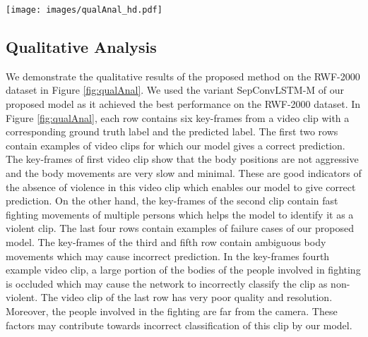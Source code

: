 \documentclass[conference]{IEEEtran}
\begin{document}
\begin{figure*}[t] 
\centering
\texttt{[image: images/qualAnal\_hd.pdf]}   \caption{Qualitative results of the proposed model (SepConvLSTM-M) for violence detection on the RWF-2000 dataset. The first two rows contain examples of video clips for which our model correctly predicts the presence of violence. The last four rows contain examples of failure cases where ambiguous body movements and poor quality of surveillance footage may lead towards incorrect prediction.}
\label{fig:qualAnal}
\end{figure*}


\subsection{Qualitative Analysis}
We demonstrate the qualitative results of the proposed method on the RWF-2000 dataset in Figure \ref{fig:qualAnal}. We used the variant SepConvLSTM-M of our proposed model as it achieved the best performance on the RWF-2000 dataset. In Figure \ref{fig:qualAnal}, each row contains six key-frames from a video clip with a corresponding ground truth label and the predicted label. The first two rows contain examples of video clips for which our model gives a correct prediction. The key-frames of first video clip show that the body positions are not aggressive and the body movements are very slow and minimal. These are good indicators of the absence of violence in this video clip which enables our model to give correct prediction. On the other hand, the key-frames of the second clip contain fast fighting movements of multiple persons which helps the model to identify it as a violent clip. The last four rows contain examples of failure cases of our proposed model. The key-frames of the third and fifth row contain ambiguous body movements which may cause incorrect prediction. In the key-frames fourth example video clip, a large portion of the bodies of the people involved in fighting is occluded which may cause the network to incorrectly classify the clip as non-violent. The video clip of the last row has very poor quality and resolution. Moreover, the people involved in the fighting are far from the camera. These factors may contribute towards incorrect classification of this clip by our model.   
\end{document}
